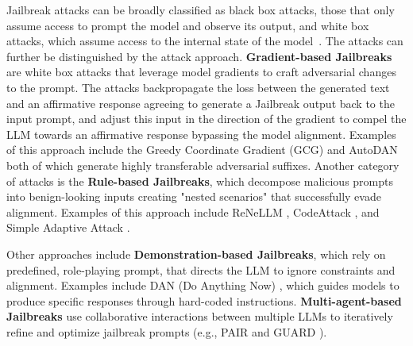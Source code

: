 \noindent Jailbreak attacks can be broadly classified as black box attacks, those that only assume access to prompt the model and observe its output, and white box attacks, which assume access to the internal state of the model~\cite{jin2024jailbreakzoo, shayegani2023survey, yi2024jailbreak}.  The attacks can further be distinguished by the attack approach.   \textbf{Gradient-based Jailbreaks} are white box attacks that leverage model gradients to craft adversarial changes to the prompt.  The attacks backpropagate the loss between the generated text and an affirmative response agreeing to generate a Jailbreak output back to the input prompt, and adjust this input in the direction of the gradient to compel the LLM towards an affirmative response bypassing the model alignment. Examples of this approach include the Greedy Coordinate Gradient (GCG) \cite{zou2023universal} and AutoDAN \cite{liu2024autodan} both of which generate highly transferable adversarial suffixes.
Another category of attacks is the \textbf{Rule-based Jailbreaks}, which decompose malicious prompts into benign-looking inputs creating "nested scenarios" that successfully evade alignment.   Examples of this approach include ReNeLLM \cite{ding2023wolf}, CodeAttack \cite{ren2024codeattack}, and Simple Adaptive Attack \cite{andriushchenko2024jailbreaking}.  %

Other approaches include \textbf{Demonstration-based Jailbreaks}, which rely on predefined, role-playing prompt, that directs the LLM to ignore constraints and alignment. Examples include DAN (Do Anything Now) \cite{shen2024anything}, which guides models to produce specific responses through hard-coded instructions.
 \textbf{Multi-agent-based Jailbreaks} use collaborative interactions between multiple LLMs to iteratively refine and optimize jailbreak prompts (e.g., PAIR \cite{chao2023jailbreaking} and GUARD \cite{wei2023jailbreak}).

